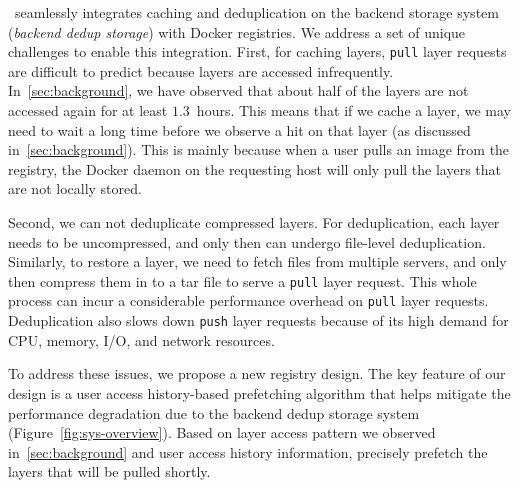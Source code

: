 \sysname~seamlessly integrates 
caching and deduplication on the
backend storage system (\emph{backend dedup storage}) with Docker registries.
%
We address a set of unique challenges to enable this integration.
%
First, for caching layers, \texttt{pull} layer requests are difficult to
predict because layers are accessed infrequently.
In~\cref{sec:background},
we have observed that about half of the layers are not
accessed again for at least $1.3$~hours. This means that if we
cache a layer, we may need to wait a long time before we observe a hit on that layer (as discussed in~\cref{sec:background}).  
This is mainly 
because when a user pulls an image from the registry, the Docker daemon on the
requesting host will only pull the layers that are not locally stored.
%

Second, we can not deduplicate compressed layers. For deduplication, each layer
needs to be uncompressed, and only then can undergo file-level deduplication. Similarly,
to restore a layer, we need to fetch files from multiple servers, and only then compress
them in to a tar file to serve a \texttt{pull} layer request. 
This whole process can incur a 
considerable performance overhead on \texttt{pull} layer requests.
Deduplication also slows down
\texttt{push} layer requests because of its high demand for CPU, memory, I/O, and network resources.

To address these issues, we propose a new registry design. The key feature of our design is a user access history-based prefetching algorithm that helps mitigate the performance degradation due to the 
backend dedup storage system (Figure~\ref{fig:sys-overview}). Based
on layer access pattern we observed in~\cref{sec:background} and user access history information,
\sysname precisely prefetch the layers that will be pulled shortly.

